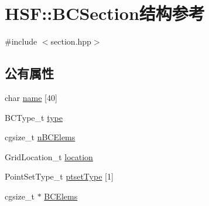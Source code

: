\hypertarget{structHSF_1_1BCSection}{
\section{HSF::BCSection结构参考}
\label{structHSF_1_1BCSection}
}


{\ttfamily \#include $<$section.hpp$>$}\subsection*{公有属性}
\begin{DoxyCompactItemize}
\item 
char \hyperlink{structHSF_1_1BCSection_a82fb0473e237f8fa0ffc44eef863fe57}{name} \mbox{[}40\mbox{]}
\item 
BCType\_\-t \hyperlink{structHSF_1_1BCSection_acc3e1b72196d3cbafc03146ae2485386}{type}
\item 
cgsize\_\-t \hyperlink{structHSF_1_1BCSection_a686d5a676d9ff20068c47ef14557fe4f}{nBCElems}
\item 
GridLocation\_\-t \hyperlink{structHSF_1_1BCSection_abb671197662a1806beb5965f89547a00}{location}
\item 
PointSetType\_\-t \hyperlink{structHSF_1_1BCSection_a2e08a35e92dcffe93be2b3c6d02d1450}{ptsetType} \mbox{[}1\mbox{]}
\item 
cgsize\_\-t $\ast$ \hyperlink{structHSF_1_1BCSection_a3cb5281963ce7df85bb0651883d66d75}{BCElems}
\end{DoxyCompactItemize}


